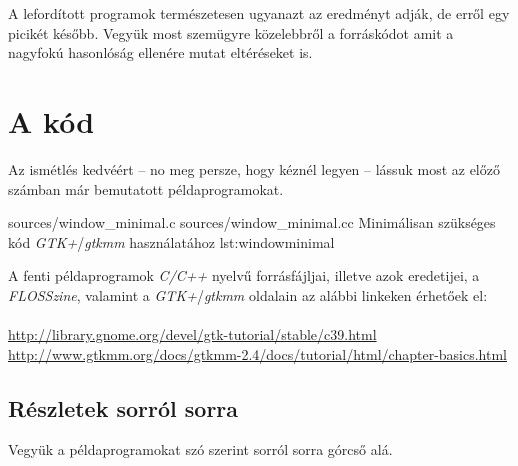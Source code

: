 A lefordított programok természetesen ugyanazt az eredményt adják, de erről egy picikét később. Vegyük most szemügyre közelebbről a forráskódot amit a nagyfokú hasonlóság ellenére mutat eltéréseket is.

\section{A kód}
\label{sec:gtkminimal}
\label{sec:gtkmmminimal}

Az ismétlés kedvéért -- no meg persze, hogy kéznél legyen -- lássuk most az előző számban már bemutatott példaprogramokat.

\lstinputsources
{sources/window_minimal.c}
{sources/window_minimal.cc}
{Minimálisan szükséges kód \textit{GTK+}/\textit{gtkmm} használatához}
{lst:windowminimal}

A fenti példaprogramok \textit{C/C++} nyelvű forrásfájljai, illetve azok eredetijei, a \textit{FLOSSzine}, valamint a \textit{GTK+}/\textit{gtkmm} oldalain az alábbi linkeken érhetőek el:
\ \\\\
\url{http://library.gnome.org/devel/gtk-tutorial/stable/c39.html}\\
\url{http://www.gtkmm.org/docs/gtkmm-2.4/docs/tutorial/html/chapter-basics.html}

\subsection{Részletek sorról sorra}

Vegyük a példaprogramokat szó szerint sorról sorra górcső alá.

